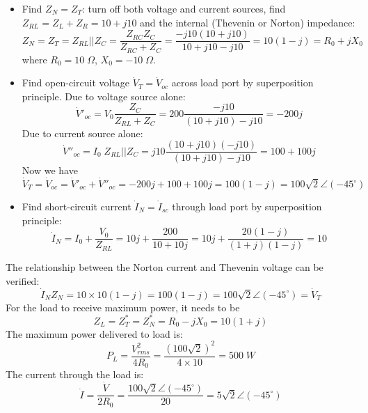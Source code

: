 \documentclass{article}
\begin{document}
\begin{itemize}
\item Find $Z_N=Z_T$: turn off both voltage and current sources, find 
  $Z_{RL}=Z_L+Z_R=10+j10$ and the internal (Thevenin or Norton) impedance:
  \begin{equation} 
    Z_N=Z_T=Z_{RL}||Z_C=\frac{Z_{RC}Z_C}{Z_{RC}+Z_C}
    =\frac{-j10(10+j10)}{10+j10-j10}=10(1-j)=R_0+jX_0
  \end{equation}
  where $R_0=10\;\Omega$, $X_0=-10\;\Omega$.
\item Find open-circuit voltage $\dot{V}_T=\dot{V}_{oc}$ across load port 
  by superposition principle. Due to voltage source alone:
  \begin{equation}
    \dot{V}'_{oc}=V_0\frac{Z_C}{Z_{RL}+Z_C}
    =200\frac{-j10}{(10+j10)-j10}=-200j 
  \end{equation}
  Due to current source alone:
  \begin{equation} 
    \dot{V}''_{oc}=I_0\;Z_{RL}||Z_C
  =j10\frac{(10+j10)(-j10)}{(10+j10)-j10}=100+100j 
  \end{equation}
  Now we have
  \begin{equation}
    \dot{V}_T=\dot{V}_{oc}=\dot{V}'_{oc}+\dot{V}''_{oc}=-200j+100+100j=100(1-j)
    =100\sqrt{2}\angle(-45^\circ) 
  \end{equation}
\item Find short-circuit current $\dot{I}_N=\dot{I}_{sc}$ through load port
  by superposition principle:
  \begin{equation} 
    \dot{I}_N=I_0+\frac{V_0}{Z_{RL}}
    =10j+\frac{200}{10+10j}=10j+\frac{20(1-j)}{(1+j)(1-j)}=10 
  \end{equation}
\end{itemize}
The relationship between the Norton current and Thevenin voltage can be
verified:
\begin{equation}
  \dot{I}_N Z_N=10\times10(1-j)=100(1-j)=100\sqrt{2}\angle(-45^\circ)=\dot{V}_T  
\end{equation}
For the load to receive maximum power, it needs to be
\begin{equation}
  Z_L=Z_T^*=Z_N^*=R_0-jX_0=10(1+j) 
\end{equation}
The maximum power delivered to load is:
\begin{equation}
  P_L=\frac{V^2_{rms}}{4R_0}=\frac{(100\sqrt{2})^2}{4\times 10}=500\;W 
\end{equation}
The current through the load is:
\begin{equation} 
  \dot{I}=\frac{\dot{V}}{2R_0}=\frac{100\sqrt{2}\angle(-45^\circ)}{20}
  =5\sqrt{2}\angle (-45^\circ) 
\end{equation}
\end{document}
